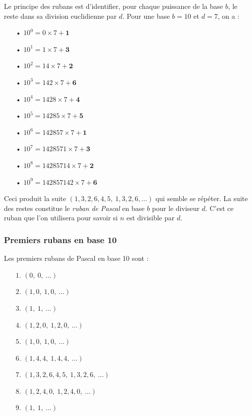 \documentclass[a4paper]{article}
\begin{document}
	Le principe des rubans est d'identifier, pour chaque puissance de la base $b$, le reste dans sa division euclidienne par $d$. Pour une base $b = 10$ et $d = 7$, on a :\\
	
\vspace{-3 mm}

\begin{itemize}

	\item[•] $10^0 = 0 × 7 + \mathbf{1}$
	\item[•] $10^1 = 1 × 7 + \mathbf{3}$
	\item[•] $10^2 = 14 × 7 + \mathbf{2}$
	\item[•] $10^3 = 142 × 7 + \mathbf{6}$
	\item[•] $10^4 = {1428} × 7 + \mathbf{4}$
	\item[•] $10^5 = {14285} × 7 + \mathbf{5}$
	\item[•] $10^6 = {142857} × 7 + \mathbf{1}$
	\item[•] $10^7 = {1428571} × 7 + \mathbf{3}$
	\item[•] $10^8 = {14285714} × 7 + \mathbf{2}$
	\item[•] $10^9 = {142857142} × 7 + \mathbf{6}$
    
\end{itemize}

\vspace{1 mm}

	Ceci produit la suite $(1,3,2,6,4,5,~1,3,2,6,\dots)$ qui semble se répéter. La suite des restes constitue le \textit{ruban de Pascal} en base $b$ pour le diviseur $d$. C'est ce ruban que l'on utilisera pour savoir si $n$ est divisible par $d$. 

\vfill



\subsubsection*{Premiers rubans en base 10}\label{ruban_base_10}

Les premiers rubans de Pascal en base 10 sont :

\begin{itemize}

	\item[$1.$] $(0,~0,~\dots)$ 
    \item[$2.$] $(1, 0,~1, 0,~\dots)$ 
    \item[$3.$] $(1,~1,~\dots)$ 
    \item[$4.$] $(1, 2, 0,~1, 2, 0,~\dots)$ 
    \item[$5.$] $(1, 0,~1, 0,~\dots)$ 
    \item[$6.$] $(1, 4, 4,~1, 4, 4,~\dots)$ 
    \item[$7.$] $(1, 3, 2, 6, 4, 5,~1, 3, 2, 6,~\dots)$ 
    \item[$8.$] $(1, 2, 4, 0,~1, 2, 4, 0,~\dots)$ 
    \item[$9.$] $(1,~1,~\dots)$ 
    
\end{itemize}
\end{document}
